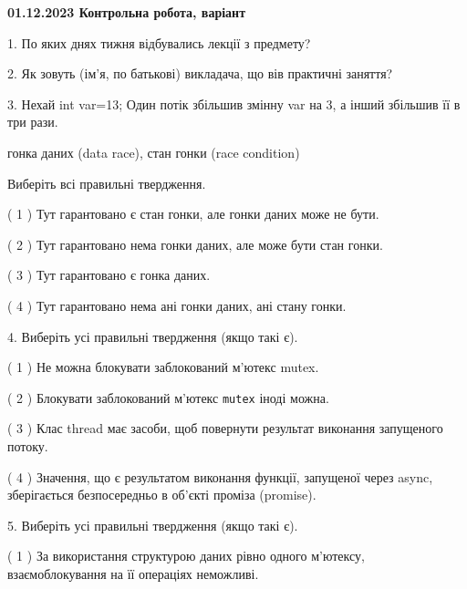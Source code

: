 \documentclass[12pt, ukrainian]{article}
\def\code#1{\Verb!#1!}
\begin{document}
\vspace{4mm}
\newpage
\begin {large}

\textbf{01.12.2023 Контрольна робота, варіант  }\par


{
1. По яких днях тижня відбувались лекції з предмету?



\vspace{5mm}
2. Як зовуть (ім'я, по батькові) викладача, що вів практичні заняття?



\vspace{5mm}
3. Нехай int var=13; Один потік збільшив змінну var на 3, а інший збільшив її в три рази.

гонка даних (data race), стан гонки (race condition)

Виберіть всі правильні твердження.\par
\vspace{2mm}
( 1 ) Тут гарантовано є стан гонки, але гонки даних може не бути.%

( 2 ) Тут гарантовано нема гонки даних, але може бути стан гонки.%

( 3 ) Тут гарантовано є гонка даних.%

( 4 ) Тут гарантовано нема ані гонки даних, ані стану гонки.%


\vspace{5mm}
4. Виберіть усі правильні твердження (якщо такі є).\par
\vspace{2mm}

( 1 ) Не можна блокувати заблокований м’ютекс mutex.%

( 2 ) Блокувати заблокований м’ютекс  \code{mutex} іноді можна.%

( 3 ) Клас thread має засоби, щоб повернути результат виконання запущеного потоку.%

( 4 ) Значення, що є результатом виконання функції, запущеної через async, зберігається безпосередньо в об’єкті проміза (promise).%


\vspace{5mm}
5. Виберіть усі правильні твердження (якщо такі є).\par
\vspace{2mm}

( 1 ) За використання структурою даних рівно одного м’ютексу, взаємоблокування на її операціях неможливі.%

}
\end{large}
\end{document}
